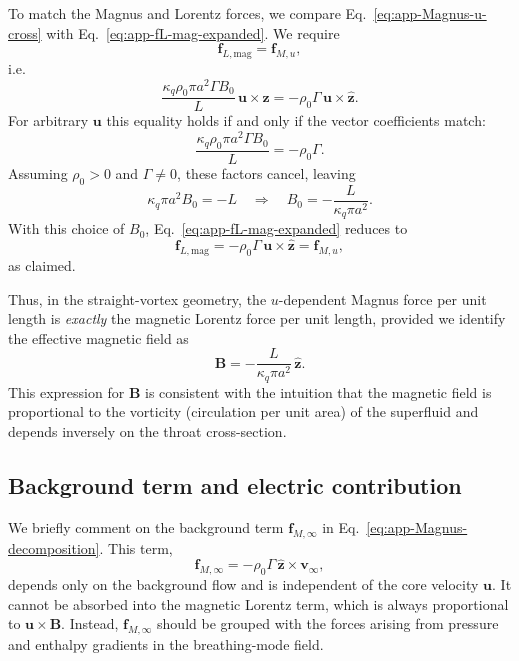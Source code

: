 \documentclass[11pt]{article}
\begin{document}
To match the Magnus and Lorentz forces, we compare Eq.~\eqref{eq:app-Magnus-u-cross} with Eq.~\eqref{eq:app-fL-mag-expanded}.  We require
\begin{equation}
\mathbf{f}_{L,\mathrm{mag}} = \mathbf{f}_{M,u},
\end{equation}
i.e.
\begin{equation}
\frac{\kappa_q \rho_0 \pi a^2 \Gamma B_0}{L}\,\mathbf{u}\times\hat{\mathbf{z}}
= -\rho_0 \Gamma\,\mathbf{u}\times\hat{\mathbf{z}}.
\end{equation}
For arbitrary $\mathbf{u}$ this equality holds if and only if the vector coefficients match:
\begin{equation}
\frac{\kappa_q \rho_0 \pi a^2 \Gamma B_0}{L}
= -\rho_0 \Gamma.
\end{equation}
Assuming $\rho_0>0$ and $\Gamma\neq 0$, these factors cancel, leaving
\begin{equation}
\kappa_q \pi a^2 B_0 = -L
\quad\Longrightarrow\quad
B_0 = -\frac{L}{\kappa_q \pi a^2}.
\label{eq:app-B0-solution}
\end{equation}
With this choice of $B_0$, Eq.~\eqref{eq:app-fL-mag-expanded} reduces to
\begin{equation}
\mathbf{f}_{L,\mathrm{mag}}
= -\rho_0 \Gamma\,\mathbf{u}\times\hat{\mathbf{z}}
= \mathbf{f}_{M,u},
\end{equation}
as claimed.

Thus, in the straight-vortex geometry, the $u$-dependent Magnus force per unit length is \emph{exactly} the magnetic Lorentz force per unit length, provided we identify the effective magnetic field as
\begin{equation}
\mathbf{B} = -\frac{L}{\kappa_q \pi a^2}\,\hat{\mathbf{z}}.
\end{equation}
This expression for $\mathbf{B}$ is consistent with the intuition that the magnetic field is proportional to the vorticity (circulation per unit area) of the superfluid and depends inversely on the throat cross-section.

\subsection{Background term and electric contribution}

We briefly comment on the background term $\mathbf{f}_{M,\infty}$ in Eq.~\eqref{eq:app-Magnus-decomposition}.  This term,
\begin{equation}
\mathbf{f}_{M,\infty}
= -\rho_0 \Gamma\,\hat{\mathbf{z}} \times \mathbf{v}_\infty,
\end{equation}
depends only on the background flow and is independent of the core velocity $\mathbf{u}$.  It cannot be absorbed into the magnetic Lorentz term, which is always proportional to $\mathbf{u}\times\mathbf{B}$.  Instead, $\mathbf{f}_{M,\infty}$ should be grouped with the forces arising from pressure and enthalpy gradients in the breathing-mode field.
\end{document}
